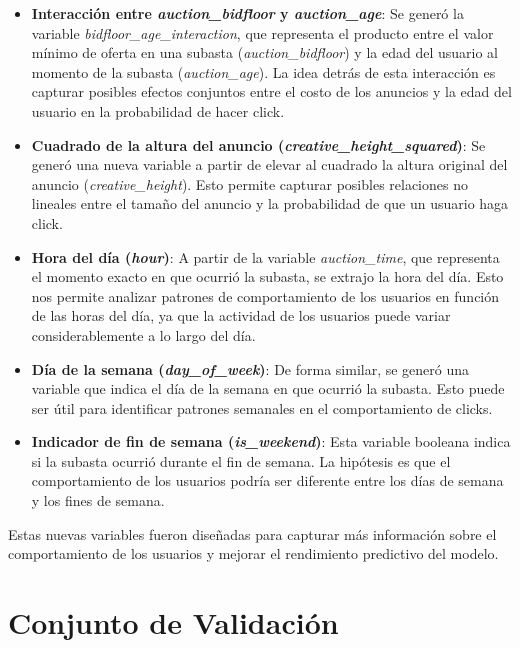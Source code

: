 \documentclass[a4paper,11pt]{article}
\begin{document}
\begin{itemize}
    \item \textbf{Interacción entre \textit{auction\_bidfloor} y \textit{auction\_age}}: Se generó la variable \textit{bidfloor\_age\_interaction}, que representa el producto entre el valor mínimo de oferta en una subasta (\textit{auction\_bidfloor}) y la edad del usuario al momento de la subasta (\textit{auction\_age}). La idea detrás de esta interacción es capturar posibles efectos conjuntos entre el costo de los anuncios y la edad del usuario en la probabilidad de hacer click.

    \item \textbf{Cuadrado de la altura del anuncio (\textit{creative\_height\_squared})}: Se generó una nueva variable a partir de elevar al cuadrado la altura original del anuncio (\textit{creative\_height}). Esto permite capturar posibles relaciones no lineales entre el tamaño del anuncio y la probabilidad de que un usuario haga click.
    
    \item \textbf{Hora del día (\textit{hour})}: A partir de la variable \textit{auction\_time}, que representa el momento exacto en que ocurrió la subasta, se extrajo la hora del día. Esto nos permite analizar patrones de comportamiento de los usuarios en función de las horas del día, ya que la actividad de los usuarios puede variar considerablemente a lo largo del día.
    
    \item \textbf{Día de la semana (\textit{day\_of\_week})}: De forma similar, se generó una variable que indica el día de la semana en que ocurrió la subasta. Esto puede ser útil para identificar patrones semanales en el comportamiento de clicks.
    
    \item \textbf{Indicador de fin de semana (\textit{is\_weekend})}: Esta variable booleana indica si la subasta ocurrió durante el fin de semana. La hipótesis es que el comportamiento de los usuarios podría ser diferente entre los días de semana y los fines de semana.
\end{itemize}

Estas nuevas variables fueron diseñadas para capturar más información sobre el comportamiento de los usuarios y mejorar el rendimiento predictivo del modelo.

\section{Conjunto de Validación}
\end{document}
